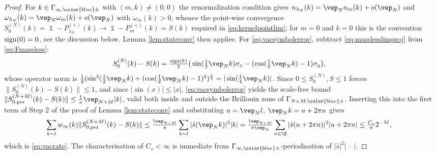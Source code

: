 \documentclass[a4paper, 11pt]{article}
\DeclareMathOperator{\1}{\mathds{1}}
\DeclareMathOperator{\sign}{\textup{sign}}
\DeclareMathOperator{\per}{per}
\begin{document}
\begin{proof}
For $k\in\Gamma_{\infty,{\color{blue}\pm}}$ with $(m,k)\neq(0,0)$ the renormalization condition gives $n_{\lambda_{N}}(k) = \vep_{N}n_{m}(k)+o(\vep_{N})$ and $\omega_{\lambda_{N}}(k) = \vep_{N}\omega_{m}(k)+o(\vep_{N})$ with $\omega_{m}(k)>0$, whence the point-wise convergence $S^{(N)}_{0}(k) = \1-P^{(+)}_{\lambda_{N}}(k)\rightarrow\1-P^{(+)}_{m}(k) = S(k)$ required in \eqref{eq:kernelpointlim}; for $m=0$ and $k=0$ this is the convention $\sign(0)=0$, see the discussion below. Lemma \ref{lem:stateconv} then applies. For \eqref{eq:vacsymbolerror}, subtract \eqref{eq:masslesslimproj} from \eqref{eq:Fmassless}:
\begin{align*}
S^{(N)}_{0}(k)-S(k) & = \tfrac{\sign(k)}{2}\big(\sin(\tfrac{1}{2}\vep_{N}k)\sigma_{x}-(\cos(\tfrac{1}{2}\vep_{N}k)-1)\sigma_{y}\big),
\end{align*}
whose operator norm is $\tfrac{1}{2}(\sin^{2}(\tfrac{1}{2}\vep_{N}k)+(\cos(\tfrac{1}{2}\vep_{N}k)-1)^{2})^{\frac{1}{2}} = |\sin(\tfrac{1}{4}\vep_{N}k)|$. Since $0\leq S^{(N)}_{0},S\leq1$ forces $\|S^{(N)}_{0}(k)-S(k)\|\leq1$, and since $|\sin(x)|\leq|x|$, \eqref{eq:vacsymbolerror} yields the scale-free bound $\|S^{(N+M)}_{0,\per}(k)-S(k)\|\leq\tfrac{1}{\pi}\vep_{N+M}|k|$, valid both inside and outside the Brillouin zone of $\Gamma_{N+M,{\color{blue}\pm}}$. Inserting this into the first term of Step 2 of the proof of Lemma \ref{lem:stateconv} and substituting $u=\vep_{N}l$, $\vep_{N}k = u+2\pi n$ gives
\begin{align*}
\sum_{k\sim l}w_{\infty}(k)\|S^{(N+M)}_{0,\per}(k)-S(k)\| & \leq \tfrac{\vep_{N+M}}{\pi}\sum_{k\sim l}|\hat{s}(\vep_{N}k)|^{2}|k| = \tfrac{\vep_{N+M}}{\pi\vep_{N}}\sum_{n\in\Z}|\hat{s}(u+2\pi n)|^{2}|u+2\pi n| \leq \tfrac{C_{s}}{\pi}2^{-M},
\end{align*}
which is \eqref{eq:vacrate}. The characterisation of $C_{s}<\infty$ is immediate from $\Gamma_{\infty,{\color{blue}\pm}}$-periodisation of $|\hat{s}|^{2}|\!\ \cdot\!\ |$.
\end{proof}
\end{document}
